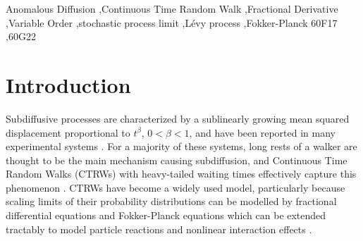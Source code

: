 \documentclass[a4paper,12pt]{elsarticle}
\numberwithin{equation}{section}
\theoremstyle{plain}
\theoremstyle{definition}
\theoremstyle{remark}
\numberwithin{equation}{section}
\newcommand{\1}{\mathbf 1}
\begin{document}
\begin{frontmatter}



\begin{keyword}
Anomalous Diffusion \sep Continuous Time Random Walk \sep Fractional Derivative \sep Variable Order \sep stochastic process limit \sep L\'evy process \sep Fokker-Planck
\MSC[2010] 60F17 \sep  60G22
\end{keyword}

\end{frontmatter}


\section{Introduction}

Subdiffusive processes are characterized by a sublinearly growing mean squared
displacement proportional to $t^\beta$, $0 < \beta < 1$, and have been reported
in many experimental systems
\citep{Metzler2000,TMT04,Santamaria2006a,Banks2005,Regner2013}.
For a majority of these systems, long rests of a walker are thought to be the
main mechanism causing subdiffusion, and Continuous Time Random Walks (CTRWs)
with heavy-tailed waiting times effectively capture this phenomenon
\citep{Scher1975,BG1990,Metzler2000}.  CTRWs have become a widely used model,
particularly because scaling limits of their probability distributions can be
modelled by fractional differential equations and Fokker-Planck equations
\citep{BMK00,Baeumer2001,HLS10PRL,Hahn11} which can be extended tractably to
model particle reactions \citep{Langlands2008d,Angstmann2013} and nonlinear
interaction effects \citep{StrakaFedotov14}.
\end{document}
